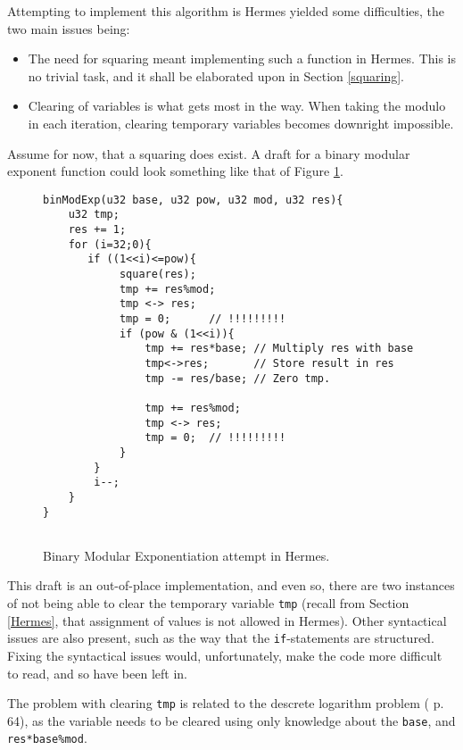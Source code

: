 Attempting to implement this algorithm is Hermes yielded some difficulties, the two main issues being:
\begin{itemize}
\item The need for squaring meant implementing such a function in Hermes. This is no trivial task, and it shall be elaborated upon in Section \ref{squaring}.
\item Clearing of variables is what gets most in the way. When taking the modulo in each iteration, clearing temporary variables becomes downright impossible.
\end{itemize}
Assume for now, that a squaring does exist. A draft for a binary modular exponent function could look something like that of Figure \ref{binModExp}.
\begin{figure}
\begin{verbatim}
binModExp(u32 base, u32 pow, u32 mod, u32 res){
    u32 tmp;
    res += 1;               
    for (i=32;0){           
       if ((1<<i)<=pow){
            square(res);        
            tmp += res%mod;     
            tmp <-> res;
            tmp = 0;      // !!!!!!!!!
            if (pow & (1<<i)){  
                tmp += res*base; // Multiply res with base
                tmp<->res;       // Store result in res
                tmp -= res/base; // Zero tmp.
 
                tmp += res%mod;
                tmp <-> res;
                tmp = 0;  // !!!!!!!!!
            }
        }
        i--;
    }
}


\end{verbatim}
\caption{Binary Modular Exponentiation attempt in Hermes.}
\label{binModExp}
\end{figure}

This draft is an out-of-place implementation, and even so, there are two instances of not being able to clear the temporary variable \texttt{tmp} (recall from Section \ref{Hermes}, that assignment of values is not allowed in Hermes). Other syntactical issues are also present, such as the way that the \texttt{if}-statements are structured. Fixing the syntactical issues would, unfortunately, make the code more difficult to read, and so have been left in.

The problem with clearing \texttt{tmp} is related to the descrete logarithm problem (\cite{IntroToMath} p. 64), as the variable needs to be cleared using only knowledge about the \texttt{base}, and \texttt{res*base\%mod}. 

